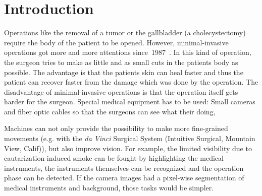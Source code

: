 
\section{Introduction}\label{sec:introduction}
Operations like the removal of a tumor or the gallbladder (a cholecystectomy)
require the body of the patient to be opened. However, minimal-invasive
operations got more and more attentions since~1987~\cite{wickham1987new}. In
this kind of operation, the surgeon tries to make as little and as small cuts
in the patients body as possible. The advantage is that the patients skin can
heal faster and thus the patient can recover faster from the damage which was
done by the operation. The disadvantage of minimal-invasive operations is that
the operation itself gets harder for the surgeon. Special medical equipment has
to be used: Small cameras and fiber optic cables so that the surgeons can see
what their doing, %

Machines can not only provide the possibility to make more fine-grained
movements (e.g. with the \textit{da Vinci} Surgical System (Intuitive Surgical,
Mountain View, Calif)), but also improve vision. For example, the limited
visibility due to cautarization-induced smoke can be fought by highlighting the
medical instruments, the instruments themselves can be recognized and the
operation phase can be detected. If the camera images had a pixel-wise
segmentation of medical instruments and background, those tasks would be
simpler.
